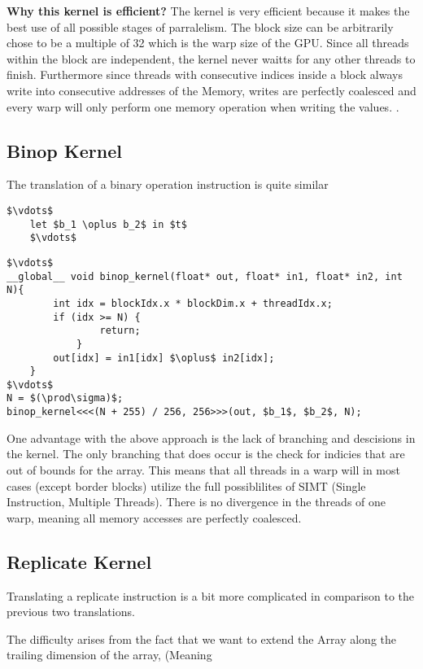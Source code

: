\textbf{Why this kernel is efficient?}
The kernel is very efficient because it makes the best use of all possible stages of parralelism.
The block size can be arbitrarily chose to be a multiple of 32 which is the warp size of the GPU.
Since all threads within the block are independent, the kernel never waitts for any other threads to finish.
Furthermore since threads with consecutive indices inside a block always write into consecutive addresses of the Memory, writes are perfectly coalesced and every warp will only perform one memory operation when writing the values.
.

\subsection{Binop Kernel}
The translation of a binary operation instruction is quite similar
\begin{lstlisting}[mathescape=true]
    $\vdots$
    let $b_1 \oplus b_2$ in $t$
    $\vdots$
\end{lstlisting}
\begin{lstlisting}[mathescape=true]
$\vdots$
__global__ void binop_kernel(float* out, float* in1, float* in2, int N){
        int idx = blockIdx.x * blockDim.x + threadIdx.x;
        if (idx >= N) {
                return;
            }
        out[idx] = in1[idx] $\oplus$ in2[idx];
    }
$\vdots$
N = $(\prod\sigma)$;
binop_kernel<<<(N + 255) / 256, 256>>>(out, $b_1$, $b_2$, N);
\end{lstlisting}

One advantage with the above approach is the lack of branching and descisions in the kernel. The only branching that does occur is the check for indicies that are out of bounds for the array.
This means that all threads in a warp will in most cases (except border blocks) utilize the full possiblilites of SIMT (Single Instruction, Multiple Threads).
There is no divergence in the threads of one warp, meaning all memory accesses are
perfectly coalesced.

\subsection{Replicate Kernel}
Translating a replicate instruction is a bit more complicated in comparison to the previous two translations.

The difficulty arises from the fact that  we want to extend the Array along the
trailing dimension of the array, (Meaning %

